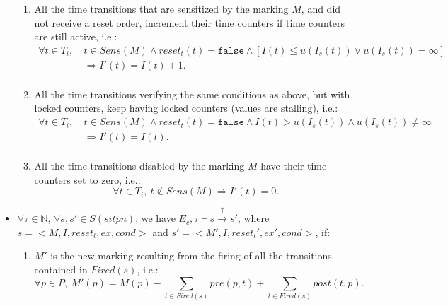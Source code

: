 \begin{definition}
\begin{itemize}
\begin{enumerate}[]
    \item\label{it:inc-counters} All the time transitions that are
      sensitized by the marking $M$, and
      did not receive a reset order, increment their time counters if time counters are still active, i.e.:
      \begin{equation*}
        \begin{split}
          \forall{}t\in{}T_i,~&t\in{}Sens(M)\land{}reset_t(t)=\mathtt{false}\land{}[I(t)\le{}u(I_s(t))\lor{}u(I_s(t))=\infty]\\
                              & \Rightarrow{}I'(t)=I(t)+1. \\
        \end{split}
      \end{equation*}
    \item\label{it:locked-counters} All the time transitions
      verifying the same
      conditions as above, but with locked counters, keep having locked counters (values are stalling), i.e.:        
      \begin{equation*}
        \begin{split}
          \forall{}t\in{}T_i,~&t\in{}Sens(M)\land{}reset_t(t)=\mathtt{false}\land{}I(t)>{}u(I_s(t))\land{}u(I_s(t))\neq\infty\\
                              & \Rightarrow{}I'(t)=I(t).\\
        \end{split}
      \end{equation*}
      
    \item\label{it:reset-not-sens} All the time transitions disabled by the marking $M$ have their time counters set to zero, i.e.:
      \begin{equation*}
        \forall{}t\in{}T_i,~t\notin{}Sens(M)\Rightarrow{}I'(t)=0.
      \end{equation*}
    \end{enumerate}
    
  \item $\forall\tau\in\mathbb{N}$, $\forall{}s,s'\in{}S(sitpn)$, we
    have $E_c,\tau\vdash{}s\xrightarrow{\uparrow}s'$, where
    $s=<M,I,reset_t,ex,cond>$ and $s'=<M',I,reset_t',ex',cond>$, if:
    \begin{enumerate}[%
      resume]
    \item\label{it:new-marking} $M'$ is the new marking resulting
      from
      the firing of all the transitions contained in $Fired(s)$, i.e.:
      \begin{equation*}
        \forall{}p\in{}P,~M'(p)=M(p)-\sum\limits_{t\in{}Fired(s)}pre(p,t)+\sum\limits_{t\in{}Fired(s)}post(t,p).
      \end{equation*}
      

\end{enumerate}
\end{itemize}
\end{definition}
